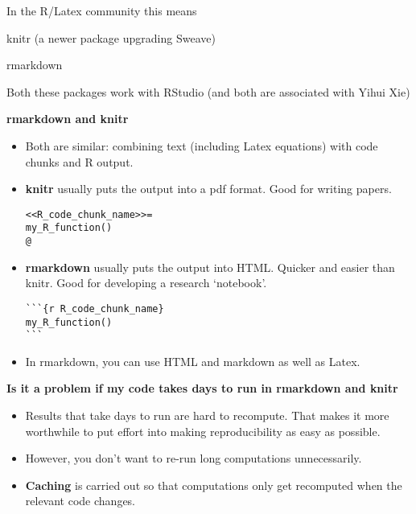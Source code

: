 \documentclass[portrait,11pt]{seminar}
\begin{document}
In the R/Latex community this means

knitr (a newer package upgrading Sweave)

rmarkdown

Both these packages work with RStudio (and both are associated with Yihui Xie)

\es
\bs

{\bf rmarkdown and knitr}

\begin{itemize}
\item Both are similar: combining text (including Latex equations) with code chunks and R output. 

\item {\bf knitr} usually puts the output into a pdf format. Good for writing papers.
\begin{verbatim}
<<R_code_chunk_name>>=
my_R_function()
@
\end{verbatim}
\item {\bf rmarkdown} usually puts the output into HTML. Quicker and easier than knitr. Good for developing a research `notebook'. 
\begin{verbatim}
```{r R_code_chunk_name}
my_R_function()
```
\end{verbatim}
 
\item In rmarkdown, you can use HTML and markdown as well as Latex.

\end{itemize}

\es
\bs

 {\bf Is it a problem if my code takes days to run in rmarkdown and knitr}

\begin{itemize}
\item Results that take days to run are hard to recompute. That makes it more worthwhile to put effort into making reproducibility as easy as possible.

\item However, you don't want to re-run long computations unnecessarily.

\item {\bf Caching} is carried out so that computations only get recomputed when the relevant code changes.

\end{itemize}
\es
 
\end{document}
